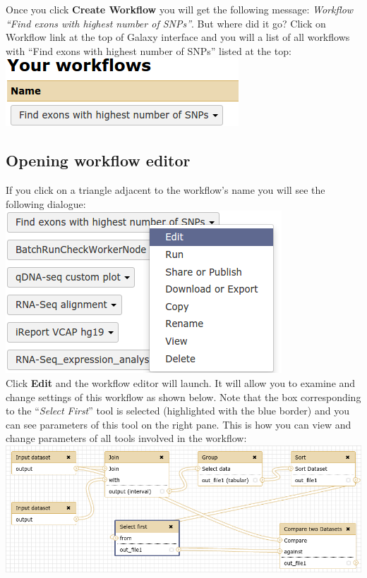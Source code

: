 \documentclass[11pt,a4paper]{article}
\begin{document}
Once you click \textbf{Create Workflow} you will get the following message: \textit{Workflow ``Find exons with highest number of SNPs''}. But where did it go? Click on Workflow link at the top of Galaxy interface and you will a list of all workflows with ``Find exons with highest number of SNPs'' listed at the top:\\
\includegraphics[scale=0.55]{figures/101_26}\\
\subsection{Opening workflow editor}
If you click on a triangle adjacent to the workflow's name you will see the following dialogue:\\
\includegraphics[scale=0.55]{figures/101_27}\\
Click \textbf{Edit} and the workflow editor will launch. It will allow you to examine and change settings of this workflow as shown below. Note that the box corresponding to the ``\textit{Select First}'' tool is selected (highlighted with the blue border) and you can see parameters of this tool on the right pane. This is how you can view and change parameters of all tools involved in the workflow:\\
\includegraphics[width=\textwidth]{figures/101_28}\\
\end{document}
